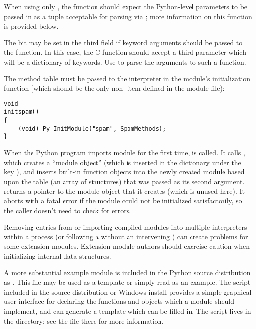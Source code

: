 \documentclass{manual}
\begin{document}
When using only , the function should expect
the Python-level parameters to be passed in as a tuple acceptable for
parsing via ; more information on this
function is provided below.

The  bit may be set in the third field if keyword
arguments should be passed to the function.  In this case, the C
function should accept a third  parameter which will
be a dictionary of keywords.  Use 
to parse the arguments to such a function.

The method table must be passed to the interpreter in the module's
initialization function (which should be the only non-
item defined in the module file):

\begin{verbatim}
void
initspam()
{
    (void) Py_InitModule("spam", SpamMethods);
}
\end{verbatim}

When the Python program imports module  for the first
time,  is called.  It calls
, which creates a ``module object'' (which
is inserted in the dictionary  under the key
), and inserts built-in function objects into the newly
created module based upon the table (an array of 
structures) that was passed as its second argument.
 returns a pointer to the module object
that it creates (which is unused here).  It aborts with a fatal error
if the module could not be initialized satisfactorily, so the caller
doesn't need to check for errors.

  Removing entries from  or importing
compiled modules into multiple interpreters within a process (or
following a  without an intervening
) can create problems for some extension modules.
Extension module authors should exercise caution when initializing
internal data structures.

A more substantial example module is included in the Python source
distribution as .  This file may be used as a 
template or simply read as an example.  The 
script included in the source distribution or Windows install provides 
a simple graphical user interface for declaring the functions and
objects which a module should implement, and can generate a template
which can be filled in.  The script lives in the
 directory; see the  file there
for more information.
\end{document}
